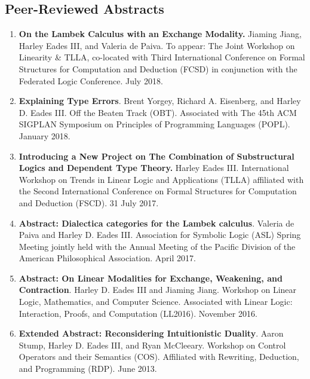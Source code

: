 \documentclass{article}
\begin{document}
  \subsection{Peer-Reviewed Abstracts}
  \label{subsec:abstracts}
  \begin{enumerate}

  \item \textbf{On the Lambek Calculus with an Exchange Modality.}
    Jiaming Jiang, Harley Eades III, and Valeria de Paiva. To appear:
    The Joint Workshop on Linearity \& TLLA, co-located with Third
    International Conference on Formal Structures for Computation and
    Deduction (FCSD) in conjunction with the Federated Logic
    Conference. July 2018.
    
  \item \textbf{Explaining Type Errors}.  Brent Yorgey, Richard
    A. Eisenberg, and Harley D. Eades III. Off the Beaten Track
    (OBT). Associated with The 45th ACM SIGPLAN Symposium on
    Principles of Programming Languages (POPL). January 2018.
    
  \item \textbf{Introducing a New Project on The Combination of
    Substructural Logics and Dependent Type Theory.} Harley Eades III.
    International Workshop on Trends in Linear Logic and Applications
    (TLLA) affiliated with the Second International Conference on
    Formal Structures for Computation and Deduction (FSCD). 31 July
    2017.
    
  \item \textbf{Abstract: Dialectica categories for the Lambek
    calculus}.  Valeria de Paiva and Harley D. Eades III. Association for
    Symbolic Logic (ASL) Spring Meeting jointly held with the Annual
    Meeting of the Pacific Division of the American Philosophical
    Association.  April 2017.
    
  \item \textbf{Abstract: On Linear Modalities for Exchange,
    Weakening, and Contraction}.  Harley D. Eades III and Jiaming Jiang.
    Workshop on Linear Logic, Mathematics, and Computer
    Science. Associated with Linear Logic: Interaction, Proofs, and
    Computation (LL2016).  November 2016.

  \item \textbf{Extended Abstract: Reconsidering Intuitionistic
    Duality}.  Aaron Stump, Harley D. Eades III, and Ryan
    McCleeary. Workshop on Control Operators and their Semantics
    (COS).  Affiliated with Rewriting, Deduction, and Programming
    (RDP). June 2013.
  \end{enumerate}
  
\end{document}
